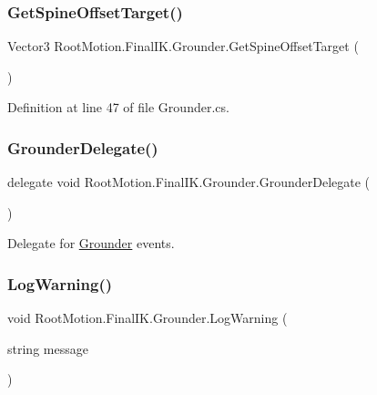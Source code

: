 \subsubsection{\texorpdfstring{Get\+Spine\+Offset\+Target()}{GetSpineOffsetTarget()}}
{\footnotesize\ttfamily Vector3 Root\+Motion.\+Final\+I\+K.\+Grounder.\+Get\+Spine\+Offset\+Target (\begin{DoxyParamCaption}{ }\end{DoxyParamCaption})\hspace{0.3cm}{\ttfamily [protected]}}



Definition at line 47 of file Grounder.\+cs.

\mbox{\label{class_root_motion_1_1_final_i_k_1_1_grounder_a1278cd21a3c872dbda95d63ac710cc26}} 
\subsubsection{\texorpdfstring{Grounder\+Delegate()}{GrounderDelegate()}}
{\footnotesize\ttfamily delegate void Root\+Motion.\+Final\+I\+K.\+Grounder.\+Grounder\+Delegate (\begin{DoxyParamCaption}{ }\end{DoxyParamCaption})}



Delegate for \mbox{\hyperlink{class_root_motion_1_1_final_i_k_1_1_grounder}{Grounder}} events. 

\mbox{\label{class_root_motion_1_1_final_i_k_1_1_grounder_a779eb7e059b491e6017e6f4085c38801}} 
\subsubsection{\texorpdfstring{Log\+Warning()}{LogWarning()}}
{\footnotesize\ttfamily void Root\+Motion.\+Final\+I\+K.\+Grounder.\+Log\+Warning (\begin{DoxyParamCaption}\item[{string}]{message }\end{DoxyParamCaption})\hspace{0.3cm}{\ttfamily [protected]}}



